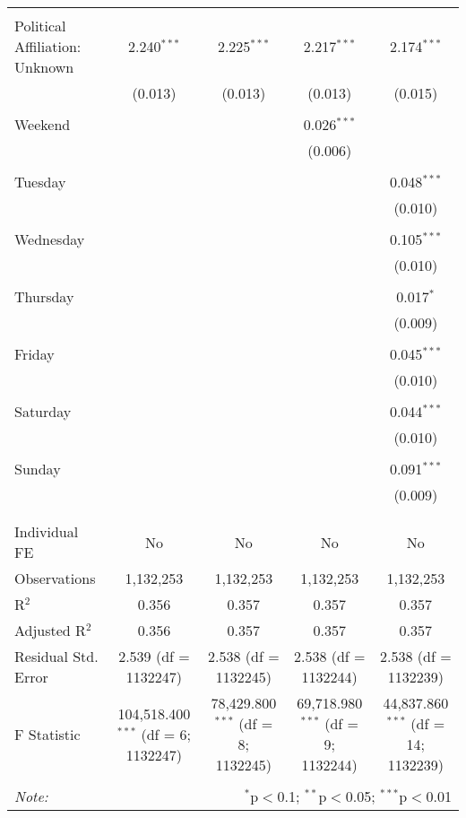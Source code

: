 \documentclass[
]{article}
\begin{document}
\begin{table}[!htbp]
{\begin{tabular}{@{\extracolsep{5pt}}lcccc}
  & & & & \\ 
 Political Affiliation: Unknown & 2.240$^{***}$ & 2.225$^{***}$ & 2.217$^{***}$ & 2.174$^{***}$ \\ 
  & (0.013) & (0.013) & (0.013) & (0.015) \\ 
  & & & & \\ 
 Weekend &  &  & 0.026$^{***}$ &  \\ 
  &  &  & (0.006) &  \\ 
  & & & & \\ 
 Tuesday &  &  &  & 0.048$^{***}$ \\ 
  &  &  &  & (0.010) \\ 
  & & & & \\ 
 Wednesday &  &  &  & 0.105$^{***}$ \\ 
  &  &  &  & (0.010) \\ 
  & & & & \\ 
 Thursday &  &  &  & 0.017$^{*}$ \\ 
  &  &  &  & (0.009) \\ 
  & & & & \\ 
 Friday &  &  &  & 0.045$^{***}$ \\ 
  &  &  &  & (0.010) \\ 
  & & & & \\ 
 Saturday &  &  &  & 0.044$^{***}$ \\ 
  &  &  &  & (0.010) \\ 
  & & & & \\ 
 Sunday &  &  &  & 0.091$^{***}$ \\ 
  &  &  &  & (0.009) \\ 
  & & & & \\ 
\hline \\[-1.8ex] 
Individual FE & No & No & No & No \\ 
Observations & 1,132,253 & 1,132,253 & 1,132,253 & 1,132,253 \\ 
R$^{2}$ & 0.356 & 0.357 & 0.357 & 0.357 \\ 
Adjusted R$^{2}$ & 0.356 & 0.357 & 0.357 & 0.357 \\ 
Residual Std. Error & 2.539 (df = 1132247) & 2.538 (df = 1132245) & 2.538 (df = 1132244) & 2.538 (df = 1132239) \\ 
F Statistic & 104,518.400$^{***}$ (df = 6; 1132247) & 78,429.800$^{***}$ (df = 8; 1132245) & 69,718.980$^{***}$ (df = 9; 1132244) & 44,837.860$^{***}$ (df = 14; 1132239) \\ 
\hline 
\hline \\[-1.8ex] 
\textit{Note:}  & \multicolumn{4}{r}{$^{*}$p$<$0.1; $^{**}$p$<$0.05; $^{***}$p$<$0.01} \\ 
\end{tabular}
} 
\end{table} 
\newpage
\end{document}
